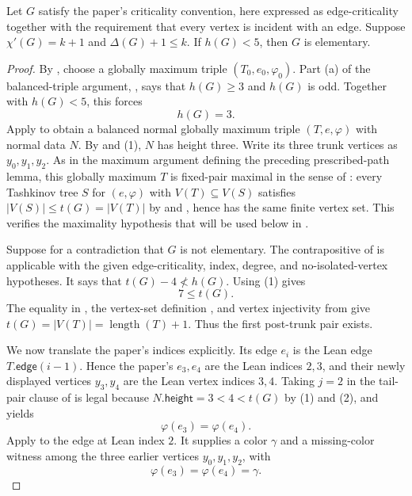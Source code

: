 \begin{theorem}
Let $G$ satisfy the paper's criticality convention, here expressed as
edge-criticality together with the requirement that every vertex is
incident with an edge.  Suppose $\chi'(G)=k+1$ and
$\Delta(G)+1\leq k$.  If $h(G)<5$, then $G$ is elementary.
\end{theorem}
\begin{proof}
By , choose a globally maximum triple
$(T_0,e_0,\varphi_0)$.  Part (a) of the balanced-triple argument,
, says that $h(G)\geq3$ and $h(G)$ is odd.
Together with $h(G)<5$, this forces
\[
 h(G)=3. \tag{1}
\]
Apply  to obtain a balanced normal globally
maximum triple $(T,e,\varphi)$ with normal data $N$.  By
 and (1), $N$ has height three.
Write its three trunk vertices as $y_0,y_1,y_2$.
As in the maximum argument defining the preceding prescribed-path lemma,
this globally maximum $T$ is fixed-pair maximal in the sense of
: every Tashkinov tree $S$
for $(e,\varphi)$ with $V(T)\subseteq V(S)$ satisfies
$|V(S)|\leq t(G)=|V(T)|$ by  and
, hence has the same finite vertex set.  This
verifies the maximality hypothesis that will be used below in
.

Suppose for a contradiction that $G$ is not elementary.  The
contrapositive of  is applicable
with the given edge-criticality, index, degree, and no-isolated-vertex
hypotheses.  It says that
$t(G)-4\not<h(G)$.  Using (1) gives
\[
 7\leq t(G). \tag{2}
\]
The equality in , the vertex-set definition
, and vertex injectivity from
 give
$t(G)=|V(T)|=\operatorname{length}(T)+1$.  Thus the first post-trunk pair
exists.

We now translate the paper's indices explicitly.  Its edge $e_i$ is the
Lean edge $T.\mathsf{edge}(i-1)$.  Hence the paper's $e_3,e_4$ are the
Lean indices $2,3$, and their newly displayed vertices $y_3,y_4$ are the
Lean vertex indices $3,4$.  Taking $j=2$ in the tail-pair clause of
 is legal because
$N.\mathsf{height}=3<4<t(G)$ by (1) and (2), and yields
\[
 \varphi(e_3)=\varphi(e_4).
\]
Apply  to the edge at Lean index $2$.  It supplies
a color $\gamma$ and a missing-color witness among the three earlier
vertices $y_0,y_1,y_2$, with
\[
 \varphi(e_3)=\varphi(e_4)=\gamma. \tag{3}
\]


\end{proof}
